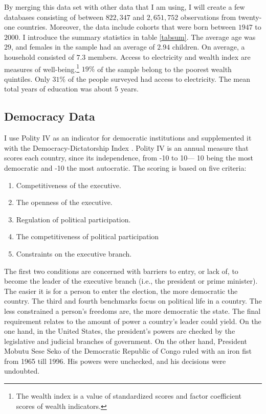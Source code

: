 \documentclass{wptemp}
\begin{document}
By merging this data set with other data that I am using, I will create a few databases consisting of between $822,347$ and $2,651,752$ observations from twenty-one countries. Moreover, the data include cohorts that were born between $1947$ to $2000$. I introduce the summary statistics in table \ref{tabsum}. The average age was $29$, and females in the sample had an average of $2.94$ children. On average, a household consisted of $7.3$ members. Access to electricity and wealth index are measures of well-being.\footnote{The wealth index is a value of standardized scores and factor coefficient scores of wealth indicators.} $19\%$ of the sample belong to the poorest wealth quintiles. Only $31\%$ of the people surveyed had access to electricity. The mean total years of education was about $5$ years.



\subsection{Democracy Data}
I use Polity IV \citep{marshall2019polity} as an indicator for democratic institutions and supplemented it with the Democracy-Dictatorship Index \citep{cheibub2010democracy}. Polity IV is an annual measure that scores each country, since its independence, from -10 to 10--- 10 being the most democratic and -10 the most autocratic. The scoring is based on five criteria: 
\begin{enumerate}
\item Competitiveness of the executive.
\item The openness of the executive.
\item Regulation of political participation. 
\item The competitiveness of political participation
\item Constraints on the executive branch. 
\end{enumerate}
The first two conditions are concerned with barriers to entry, or lack of, to become the leader of the executive branch (i.e., the president or prime minister). The easier it is for a person to enter the election, the more democratic the country. The third and fourth benchmarks focus on political life in a country. The less constrained a person's freedoms are, the more democratic the state. The final requirement relates to the amount of power a country's leader could yield. On the one hand, in the United States, the president's powers are checked by the legislative and judicial branches of government.
On the other hand, President Mobutu Sese Seko of the Democratic Republic of Congo ruled with an iron fist from 1965 till 1996. His powers were unchecked, and his decisions were undoubted. 
\end{document}
